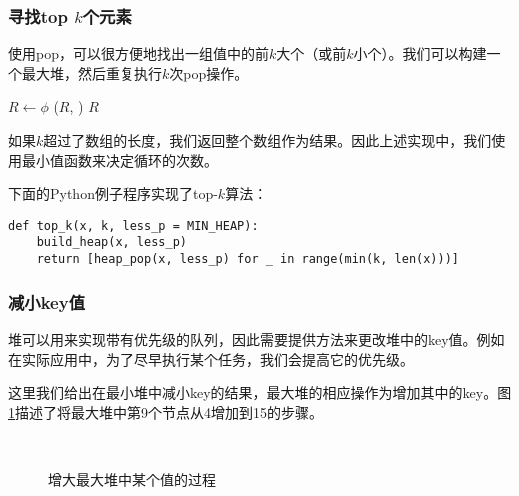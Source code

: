 \documentclass[UTF8]{article}
\begin{document}
\subsubsection{寻找top $k$个元素}

使用pop，可以很方便地找出一组值中的前$k$大个（或前$k$小个）。我们可以构建一个最大堆，然后重复执行$k$次pop操作。

\begin{algorithmic}[1]
  \State $R \gets \phi$
  \State {}
    \State {}($R$, )
  \EndFor
  \State \Return $R$
\EndFunction
\end{algorithmic}

如果$k$超过了数组的长度，我们返回整个数组作为结果。因此上述实现中，我们使用最小值函数来决定循环的次数。

下面的Python例子程序实现了top-$k$算法：

\lstset{language=Python}
\begin{lstlisting}
def top_k(x, k, less_p = MIN_HEAP):
    build_heap(x, less_p)
    return [heap_pop(x, less_p) for _ in range(min(k, len(x)))]
\end{lstlisting}

\subsubsection{减小key值}

堆可以用来实现带有优先级的队列，因此需要提供方法来更改堆中的key值。例如在实际应用中，为了尽早执行某个任务，我们会提高它的优先级。

这里我们给出在最小堆中减小key的结果，最大堆的相应操作为增加其中的key。图\ref{fig:decrease-key-2}描述了将最大堆中第9个节点从4增加到15的步骤。

\captionsetup[subfigure]{labelformat=empty, margin=10pt}
\begin{figure}[htbp]
    \centering
     \\
    \caption{增大最大堆中某个值的过程} \label{fig:decrease-key-2}
\end{figure}
\captionsetup[subfigure]{labelformat=parens}
\end{document}
